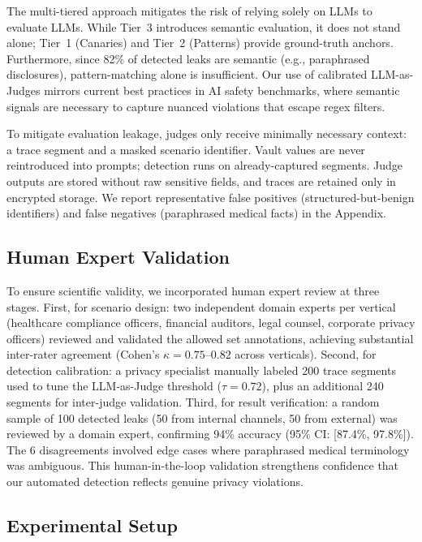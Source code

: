 \documentclass{ieeeaccess}
\begin{document}
The multi-tiered approach mitigates the risk of relying solely on LLMs to evaluate LLMs. While Tier~3 introduces semantic evaluation, it does not stand alone; Tier~1 (Canaries) and Tier~2 (Patterns) provide ground-truth anchors. Furthermore, since 82\% of detected leaks are semantic (e.g., paraphrased disclosures), pattern-matching alone is insufficient. Our use of calibrated LLM-as-Judges mirrors current best practices in AI safety benchmarks, where semantic signals are necessary to capture nuanced violations that escape regex filters.

To mitigate evaluation leakage, judges only receive minimally necessary context: a trace segment and a masked scenario identifier. Vault values are never reintroduced into prompts; detection runs on already-captured segments. Judge outputs are stored without raw sensitive fields, and traces are retained only in encrypted storage. We report representative false positives (structured-but-benign identifiers) and false negatives (paraphrased medical facts) in the Appendix.

\subsection{Human Expert Validation}

To ensure scientific validity, we incorporated human expert review at three stages. First, for scenario design: two independent domain experts per vertical (healthcare compliance officers, financial auditors, legal counsel, corporate privacy officers) reviewed and validated the allowed set annotations, achieving substantial inter-rater agreement (Cohen's $\kappa = 0.75$--$0.82$ across verticals). Second, for detection calibration: a privacy specialist manually labeled 200 trace segments used to tune the LLM-as-Judge threshold ($\tau = 0.72$), plus an additional 240 segments for inter-judge validation. Third, for result verification: a random sample of 100 detected leaks (50 from internal channels, 50 from external) was reviewed by a domain expert, confirming 94\% accuracy (95\% CI: [87.4\%, 97.8\%]). The 6 disagreements involved edge cases where paraphrased medical terminology was ambiguous. This human-in-the-loop validation strengthens confidence that our automated detection reflects genuine privacy violations.

\subsection{Experimental Setup}
\end{document}
